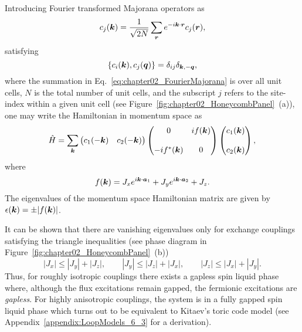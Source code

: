 Introducing Fourier transformed Majorana operators as
%
\begin{equation}
	c_j(\bm{k}) = \frac{1}{\sqrt{2N}} \sum_{\bm{r}} e^{-i \bm{k}\cdot\bm{r}} c_j(\bm{r}),
	\label{eq:chapter02_FourierMajorana}
\end{equation}
%
satisfying
%
\begin{equation}
	\{c_i(\bm{k}), c_j(\bm{q})\} = \delta_{ij}\delta_{\bm{k},-\bm{q}},
\end{equation}
%
where the summation in Eq.~\eqref{eq:chapter02_FourierMajorana} is over all unit cells, $N$ is the total number of unit cells, and the subscript $j$ refers to the site-index within a given unit cell (see Figure~\ref{fig:chapter02_HoneycombPanel}~(a)), one may write the Hamiltonian in momentum space as
%
\begin{equation}
	\hat{H} = \sum_{\bm{k}}
	\begin{pmatrix}
		c_1 (-\bm{k}) &
		c_2 (-\bm{k})
	\end{pmatrix}
	\begin{pmatrix}
		0 &
		i f(\bm{k}) \\
		&\\
		-i f^*(\bm{k}) &
		0
	\end{pmatrix}
	\begin{pmatrix}
		c_1 (\bm{k}) \\
		\\
		c_2 (\bm{k})
	\end{pmatrix},
\end{equation}
%
where
%
\begin{equation}
	f(\bm{k}) = J_x e^{i \bm{k}\cdot\bm{a}_1} + J_y e^{i \bm{k}\cdot\bm{a}_2} + J_z.
\end{equation}
%
The eigenvalues of the momentum space Hamiltonian matrix are given by $\epsilon(\bm{k}) = \pm |f(\bm{k})|$.

It can be shown that there are vanishing eigenvalues only for exchange couplings satisfying the triangle inequalities (see phase diagram in Figure~\ref{fig:chapter02_HoneycombPanel}~(b))
%
\begin{equation}
	|J_x| \leq |J_y| + |J_z|, \qquad |J_y| \leq |J_z| + |J_x|, \qquad |J_z| \leq |J_x| + |J_y|.
\end{equation}
%
Thus, for roughly isotropic couplings there exists a gapless spin liquid phase where, although the flux excitations remain gapped, the fermionic excitations are \textit{gapless}.
For highly anisotropic couplings, the system is in a fully gapped spin liquid phase which turns out to be equivalent to Kitaev's toric code model \cite{KitaevAoP2003,KitaevAoP2006} (see Appendix~\ref{appendix:LoopModels_6_3} for a derivation).

